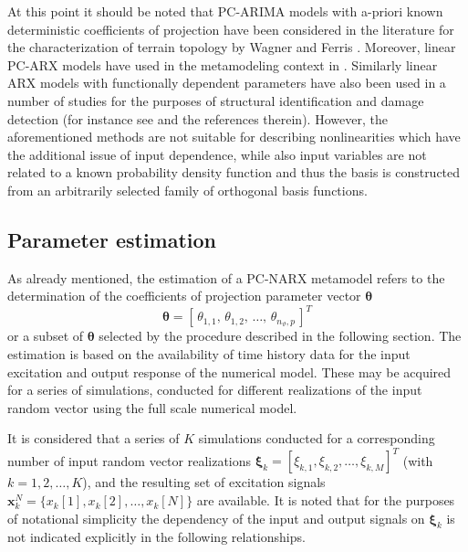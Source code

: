 \documentclass[preprint,3p,review,times,11pt]{elsarticle}
\newcommand{\beq}{\begin{equation}}
\newcommand{\eeq}{\end{equation}}
\newcommand{\bld}[1]{\boldsymbol{#1}}
\newcommand{\bth}{\bld{\theta}}
\newcommand{\bxi}{\bld{\xi}}
\begin{document}
At this point it should be noted that PC-ARIMA models with a-priori known deterministic coefficients of projection have been considered in the literature for the characterization of terrain topology by Wagner and Ferris \cite{Wagner-Ferris2007}. Moreover, linear PC-ARX models have used in the metamodeling context in \cite{Spiridonakos-Chatzi2012}. Similarly linear ARX models with functionally dependent parameters have also been used in a number of studies for the purposes of structural identification and damage detection (for instance see \cite{Kopsaftopoulos-Fassois2012} and the references therein). However, the aforementioned methods are not suitable for describing nonlinearities which have the additional issue of input dependence, while also input variables are not related to a known probability density function and thus the basis is constructed from an arbitrarily selected family of orthogonal basis functions. 


\subsection{Parameter estimation}\label{sec:MPE}

As already mentioned, the estimation of a PC-NARX metamodel refers to the determination of the coefficients of projection parameter vector $\bth$ 
\beq \bth = [\, \theta_{1,1} , \, \theta_{1,2}, \, \ldots ,\, \theta_{n_\vartheta,p} \, ]^T \eeq 
or a subset of $\bth$ selected by the procedure described in the following section. The estimation is based on the availability of time history data for the input excitation and output response of the numerical model. These may be acquired for a series of simulations, conducted for different realizations of the input random vector using the full scale numerical model.


It is considered that a series of $K$ simulations conducted for a corresponding number of input random vector realizations $\bxi_k = [\xi_{k,1}, \xi_{k,2}, \ldots ,\xi_{k,M}]^T$ (with $k=1,2,\ldots,K$), and the resulting set of excitation signals ${\bld x}_k^N = \{ x_k[1], x_k[2], \ldots, x_k[N] \}$ are available. It is noted that for the purposes of notational simplicity the dependency of the input and output signals on $\bxi_k$ is not indicated explicitly in the following relationships.
\end{document}
